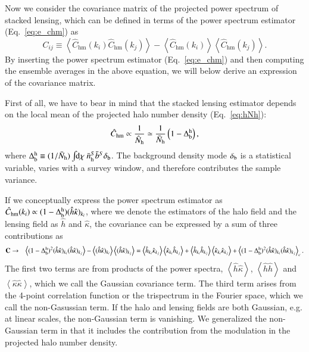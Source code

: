 \documentclass[onecolumn,notitlepage,showpacs,amsmath,amssymb,prd,floatfix]{revtex4-1}
\def\ave#1{\left\langle #1 \right\rangle}
\newcommand{\dr}{\mathrm{d}}
\newcommand{\deltab}{\delta_{\rm b}}
\newcommand{\hchm}{\hat{C}_{\mathrm{hm}}}
\newcommand{\bnhs}{\bar{n}_{\rm h}^S}
\newcommand{\hNh}{\hat{N}_{\rm h}}
\newcommand{\bNh}{\bar{N}_{\rm h}}
\newcommand{\br}{{\rm b}}
\begin{document}
Now we consider the covariance matrix of the projected power spectrum of
stacked lensing, which can be defined in terms of the power spectrum
estimator (Eq.~\ref{eq:e_chm}) as
%
\begin{equation}
 C_{ij}\equiv
  \ave{\hchm(k_i)\hchm(k_j)}-\ave{\hchm(k_i)}\ave{\hchm(k_j)}.
  \label{eq:def_cov}
\end{equation}
%
By inserting the power spectrum estimator (Eq.~\ref{eq:e_chm}) and then
computing the ensemble averages in the above equation, we will below
derive an expression of the covariance matrix. 

First of all, we have to bear in mind that
the stacked lensing estimator depends on the local mean of the projected
halo number density (Eq.~\ref{eq:hNh}): 
%
\begin{equation}
 \hchm\propto
  \frac{1}{\hNh}\simeq \frac{1}{\bNh}\left(1-\Delta^{\rm h}_{\br}\right),
\label{eq:def_Deltahb}
\end{equation}
%
where
$\Delta_{\br}^{\rm h}\equiv
(1/\bNh)\int\!\!\dr\chi~\bnhs\bar{b}^S\deltab$.
The background density mode $\deltab$ is a statistical variable, varies
with a survey window, and therefore contributes the sample variance. 

If we conceptually express the power spectrum estimator as
$\hchm(k_i)\propto (1-\Delta^{\rm h}_{\br})(\hat{h}\hat{\kappa})_{k_i}$,
where we denote the estimators of the halo field and the lensing field
as $\hat{h}$ and $\hat{\kappa}$, the covariance can be expressed by a
sum of three contributions as
%
\begin{eqnarray}
 {\bf C}&\rightarrow& \ave{(1-\Delta^{\rm h}_{\br})^2(\hat{h}\hat{\kappa})_{k_i}(\hat{h}\hat{\kappa})_{k_j}
  }-\ave{(\hat{h}\hat{\kappa})_{k_i}}\ave{(\hat{h}\hat{\kappa})_{k_j}}
  =\ave{\hat{h}_{k_i}\hat{\kappa}_{k_j}}\ave{\hat{\kappa}_{k_i}\hat{h}_{k_j}}
  +\ave{\hat{h}_{k_i}\hat{h}_{k_j}}\ave{\hat{\kappa}_{k_i}\hat{\kappa}_{k_j}}
  +\ave{(1-\Delta_{\br}^{\rm h})^2
  (\hat{h}\hat{\kappa})_{k_i}(\hat{h}\hat{\kappa})_{k_j}}_c.
  \label{eq:cov_formal}
\end{eqnarray}
%
The first two terms are from products of the power spectra,
$\ave{\hat{h}\hat{\kappa}}$, $\ave{\hat{h}\hat{h}}$ and
$\ave{\hat{\kappa}\hat{\kappa}}$, which we call the Gaussian covariance
term. The third term arises from the 4-point correlation function or the
trispectrum in the Fourier space, which we call the non-Gasussian term.
If the halo and lensing fields are both Gaussian, e.g. at linear scales,
the non-Gaussian term is vanishing. We generalized the non-Gaussian term
in that it includes the contribution from the modulation in the
projected halo number density. 
\end{document}
